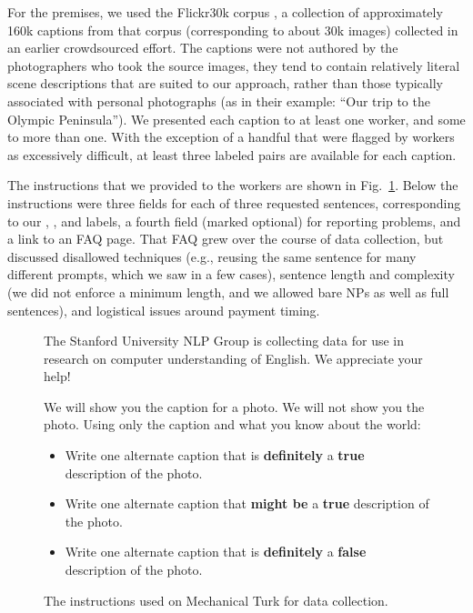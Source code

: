 For the premises, we used the Flickr30k corpus \cite{hodoshimage}, a collection of approximately 160k captions from that corpus (corresponding to about 30k images) collected in an earlier crowdsourced effort. The captions were not authored by the photographers who took the source images, they tend to contain relatively literal scene descriptions that are suited to our approach, rather than those typically associated with personal photographs (as in their example: ``Our trip to the Olympic Peninsula''). We presented each caption to at least one worker, and some to more than one. With the exception of a handful that were flagged by workers as excessively difficult, at least three labeled pairs are available for each caption.

The instructions that we provided to the workers are shown in Fig.~\ref{instructions-1}. Below the instructions were three fields for each of three requested sentences, corresponding to our , , and  labels, a fourth field (marked optional) for reporting problems, and a link to an FAQ page. That FAQ grew over the course of data collection, but discussed disallowed techniques (e.g., reusing the same sentence for many different prompts, which we saw in a few cases), sentence length and complexity (we did not enforce a minimum length, and we allowed bare NPs as well as full sentences), and logistical issues around payment timing.

\begin{figure}
\footnotesize
The Stanford University NLP Group is collecting data for use in research on computer understanding of English. We appreciate your help!

We will show you the caption for a photo. We will not show you the photo. Using only the caption and what you know about the world:
\begin{itemize}
\item Write one alternate caption that is \textbf{definitely} a \textbf{true} description of the photo. 
\item Write one alternate caption that \textbf{might be} a \textbf{true} description of the photo. 
\item Write one alternate caption that is \textbf{definitely} a \textbf{false} description of the photo. 
\end{itemize}
\caption{\label{instructions-1}The instructions used on Mechanical Turk for data collection.}
\end{figure}

